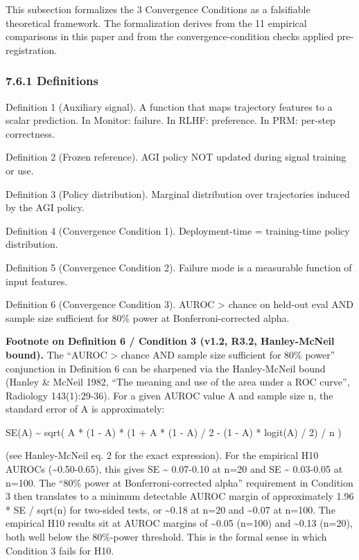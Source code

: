 \documentclass[
]{article}
\begin{document}
This subsection formalizes the 3 Convergence Conditions as a falsifiable
theoretical framework. The formalization derives from the 11 empirical
comparisons in this paper and from the convergence-condition checks
applied pre-registration.

\subsubsection{7.6.1 Definitions}\label{definitions}

Definition 1 (Auxiliary signal). A function that maps trajectory
features to a scalar prediction. In Monitor: failure. In RLHF:
preference. In PRM: per-step correctness.

Definition 2 (Frozen reference). AGI policy NOT updated during signal
training or use.

Definition 3 (Policy distribution). Marginal distribution over
trajectories induced by the AGI policy.

Definition 4 (Convergence Condition 1). Deployment-time = training-time
policy distribution.

Definition 5 (Convergence Condition 2). Failure mode is a measurable
function of input features.

Definition 6 (Convergence Condition 3). AUROC \textgreater{} chance on
held-out eval AND sample size sufficient for 80\% power at
Bonferroni-corrected alpha.

\textbf{Footnote on Definition 6 / Condition 3 (v1.2, R3.2,
Hanley-McNeil bound).} The ``AUROC \textgreater{} chance AND sample size
sufficient for 80\% power'' conjunction in Definition 6 can be sharpened
via the Hanley-McNeil bound (Hanley \& McNeil 1982, ``The meaning and
use of the area under a ROC curve'', Radiology 143(1):29-36). For a
given AUROC value A and sample size n, the standard error of A is
approximately:

SE(A) \textasciitilde{} sqrt( A * (1 - A) * (1 + A * (1 - A) / 2 - (1 -
A) * logit(A) / 2) / n )

(see Hanley-McNeil eq. 2 for the exact expression). For the empirical
H10 AUROCs (\textasciitilde0.50-0.65), this gives SE \textasciitilde{}
0.07-0.10 at n=20 and SE \textasciitilde{} 0.03-0.05 at n=100. The
``80\% power at Bonferroni-corrected alpha'' requirement in Condition 3
then translates to a minimum detectable AUROC margin of approximately
1.96 * SE / sqrt(n) for two-sided tests, or \textasciitilde0.18 at n=20
and \textasciitilde0.07 at n=100. The empirical H10 results sit at AUROC
margins of \textasciitilde0.05 (n=100) and \textasciitilde0.13 (n=20),
both well below the 80\%-power threshold. This is the formal sense in
which Condition 3 fails for H10.
\end{document}
